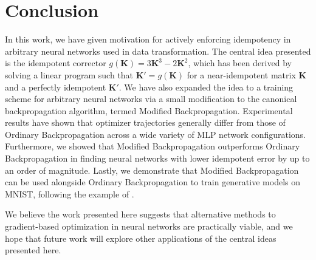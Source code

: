 \documentclass{article}
\theoremstyle{plain}
\theoremstyle{definition}
\theoremstyle{remark}
\newcommand{\vK}{\mathbf{K}}
\begin{document}
\section{Conclusion}
\label{sec:conclusion}
In this work, we have given motivation for actively enforcing idempotency in arbitrary neural networks used in data transformation. The central idea presented is the idempotent corrector ${g(\vK) = 3\vK^3 - 2\vK^2}$, which has been derived by solving a linear program such that ${\vK' = g(\vK)}$ for a near-idempotent matrix $\vK$ and a perfectly idempotent $\vK'$. We have also expanded the idea to a training scheme for arbitrary neural networks via a small modification to the canonical backpropagation algorithm, termed Modified Backpropagation. Experimental results have shown that optimizer trajectories generally differ from those of Ordinary Backpropagation across a wide variety of MLP network configurations. Furthermore, we showed that Modified Backpropagation outperforms Ordinary Backpropagation in finding neural networks with lower idempotent error by up to an order of magnitude. Lastly, we demonstrate that Modified Backpropagation can be used alongside Ordinary Backpropagation to train generative models on MNIST, following the example of \citealt{shocher-ign}.

We believe the work presented here suggests that alternative methods to gradient-based optimization in neural networks are practically viable, and we hope that future work will explore other applications of the central ideas presented here.

%
%
\end{document}
